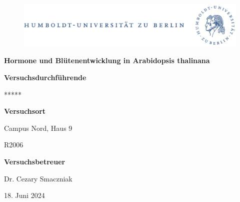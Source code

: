 \documentclass[10pt,a4paper]{article}
\begin{document}
	
	\begin{titlepage}
		\begin{center}
			\begin{figure}[h!tbp]
				\includegraphics[width=\linewidth]{HUlogo.PNG}
			\end{figure}
			\vspace*{2 cm}
			
			\textcolor{Bluetitle}{\textbf{\huge Hormone und Blütenentwicklung in Arabidopsis thalinana}}\par
			
			\vspace*{2cm}
			
			\textcolor{Greyish}{\textbf{Versuchsdurchführende}}\par
			\textcolor{Greyish}{*****}\par
			
			\vspace*{0.5cm}
			\textcolor{Greyish}{\textbf{Versuchsort}}\par
			\textcolor{Greyish}{Campus Nord, Haus 9}\par
			\textcolor{Greyish}{R2006}\par
			\vspace*{0.5cm}
			\textcolor{Greyish}{\textbf{Versuchsbetreuer}}\par
			\textcolor{Greyish}{Dr. Cezary Smaczniak}\par
			
			\vspace*{2 cm}
			
			\textcolor{Greyish}{18. Juni 2024}\par
			
			
			
			
		\end{center}
	\end{titlepage}
	
	\tableofcontents
	
\end{document}
